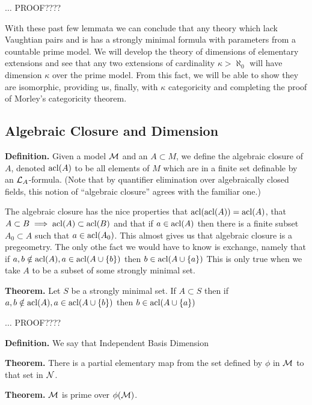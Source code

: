 {\color{red}\(\ldots\) PROOF????} %

With these past few lemmata we can conclude that any theory which lack Vaughtian pairs and is \omst has a strongly minimal formula with parameters from a countable prime model. 
We will develop the theory of dimensions of elementary extensions and see that any two extensions of cardinality \(\kappa > \aleph_0\) will have dimension \(\kappa\) over the prime model.
From this fact, we will be able to show they are isomorphic, providing us, finally, with \(\kappa\) categoricity and completing the proof of Morley's categoricity theorem. 

\subsection{Algebraic Closure and Dimension}

\textbf{Definition.} Given a model \(\mathcal{M}\) and an \(A \subset M\), we define the algebraic closure of \(A\), denoted \(\text{acl}(A)\) to be all elements of \(M\) which are in a finite set definable by an \(\mathcal{L}_A\)-formula. 
(Note that by quantifier elimination over algebraically closed fields, this notion of ``algebraic closure'' agrees with the familiar one.)

The algebraic closure has the nice properties that \(\text{acl}(\text{acl}(A)) = \text{acl}(A)\), that \(A \subset B \implies \text{acl}(A) \subset \text{acl}(B)\) and that if \(a \in \text{acl}(A)\) then there is a finite subset \(A_0 \subset A\) such that \(a \in \text{acl}(A_0)\).
This almost gives us that algebraic closure is a pregeometry. 
The only othe fact we would have to know is exchange, namely that if \(a, b \notin \text{acl}(A), a \in \text{acl}(A \cup \{b\})\) then \(b \in \text{acl}(A \cup \{a\})\) 
This is only true when we take \(A\) to be a subset of some strongly minimal set.

\textbf{Theorem.} Let \(S\) be a strongly minimal set. If \(A \subset S\) then if \(a, b \notin \text{acl}(A), a \in \text{acl}(A \cup \{b\})\) then \(b \in \text{acl}(A \cup \{a\})\) 

{\color{red}\(\ldots\) PROOF????} %

\textbf{Definition.} We say that %
Independent %
Basis %
Dimension

\textbf{Theorem.} There is a partial elementary map from the set defined by \(\phi\) in \(\mathcal{M}\) to that set in \(\mathcal{N}\). %

\textbf{Theorem.} \(\mathcal{M}\) is prime over \(\phi(\mathcal{M})\).

